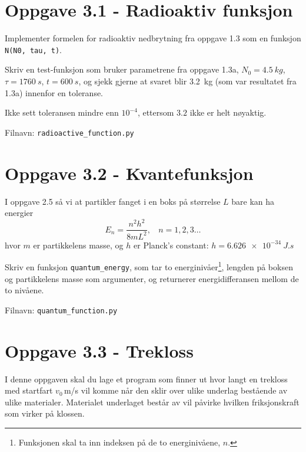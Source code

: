 \documentclass[10pt,a4paper]{article}
\newcommand{\planck}{$h = \SI{6.626e-34}{J.s}$}
\begin{document}
\section*{Oppgave 3.1 - Radioaktiv funksjon}
Implementer formelen for radioaktiv nedbrytning fra oppgave 1.3 som en funksjon \texttt{N(N0, tau, t)}.
 
Skriv en test-funksjon som bruker parametrene fra oppgave 1.3a, $N_0 = \SI{4.5}{kg}$, $\tau=\SI{1760}{s}$, $t=\SI{600}{s}$, og sjekk gjerne at svaret blir \SI{3.2}{kg} (som var resultatet fra 1.3a) innenfor en toleranse.
 
Ikke sett toleransen mindre enn $10^{-4}$, ettersom $3.2$ ikke er helt nøyaktig.
 
Filnavn: \texttt{radioactive\_function.py}
 
 
 
 

\section*{Oppgave 3.2 - Kvantefunksjon}
I oppgave 2.5 så vi at partikler fanget i en boks på størrelse $L$ bare kan ha energier
\[	E_n = \frac{n^2 h^2}{8 m L^2}, \ \ \ \ n = 1,2,3\dots
\]
hvor $m$ er partikkelens masse, og $h$ er Planck's constant: \planck
 
Skriv en funksjon \texttt{quantum\_energy}, som tar to energinivåer\footnote{Funksjonen skal ta inn indeksen på de to energinivåene, $n$.}, lengden på boksen og partikkelens masse som argumenter, og returnerer energidifferansen mellom de to nivåene.
 
Filnavn: \texttt{quantum\_function.py}
 
 
 
 
 
\section*{Oppgave 3.3 - Trekloss}
I denne oppgaven skal du lage et program som finner ut hvor langt en trekloss med startfart $v_0\,$m/s vil komme når den sklir over ulike underlag bestående av ulike materialer. Materialet underlaget består av vil påvirke hvilken friksjonskraft som virker på klossen. 
	
\end{document}
